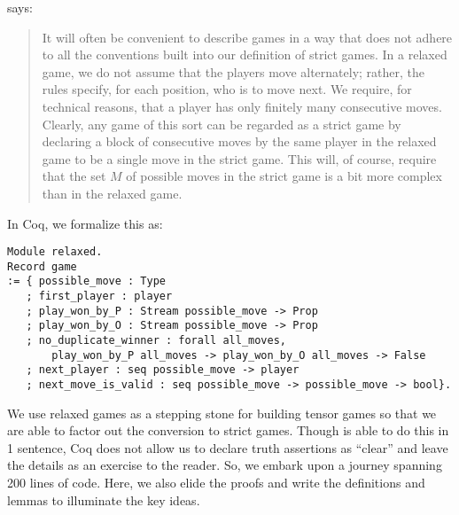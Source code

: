 \documentclass{article}
\theoremstyle{definition}
\begin{document}
\textcite[p.~187]{Blass1992} says: 

\begin{quote}
    It will often be convenient to describe games in a way that does not adhere to all the conventions built into our definition of strict games. In a relaxed game, we do not assume that the players move alternately; rather, the rules specify, for each position, who is to move next. We require, for technical reasons, that a player has only finitely many consecutive moves. Clearly, any game of this sort can be regarded as a strict game by declaring a block of consecutive moves by the same player in the relaxed game to be a single move in the strict game. This will, of course, require that the set $M$ of possible moves in the strict game is a bit more complex than in the relaxed game.
\end{quote}

In Coq, we formalize this as:

\begin{verbatim}
Module relaxed.
Record game
:= { possible_move : Type
   ; first_player : player
   ; play_won_by_P : Stream possible_move -> Prop
   ; play_won_by_O : Stream possible_move -> Prop
   ; no_duplicate_winner : forall all_moves, 
       play_won_by_P all_moves -> play_won_by_O all_moves -> False
   ; next_player : seq possible_move -> player 
   ; next_move_is_valid : seq possible_move -> possible_move -> bool}.    
\end{verbatim}

We use relaxed games as a stepping stone for building tensor games so that we are able to factor out the conversion to strict games. Though \textcite{Blass1992} is able to do this in 1 sentence, Coq does not allow us to declare truth assertions as ``clear'' and leave the details as an exercise to the reader. So, we embark upon a journey spanning 200 lines of code. Here, we also elide the proofs and write the definitions and lemmas to illuminate the key ideas. 
\end{document}
